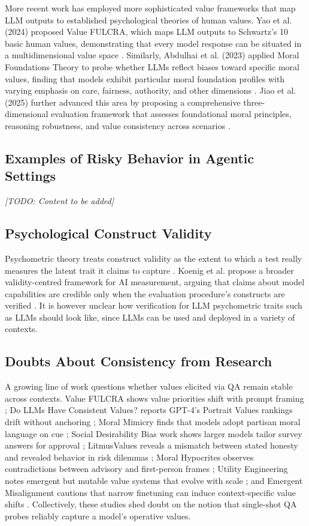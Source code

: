\documentclass[11pt]{article}
\begin{document}
More recent work has employed more sophisticated value frameworks that map LLM outputs to established psychological theories of human values. Yao et al. (2024) proposed Value FULCRA, which maps LLM outputs to Schwartz's 10 basic human values, demonstrating that every model response can be situated in a multidimensional value space \cite{yao2024fulcra}. Similarly, Abdulhai et al. (2023) applied Moral Foundations Theory to probe whether LLMs reflect biases toward specific moral values, finding that models exhibit particular moral foundation profiles with varying emphasis on care, fairness, authority, and other dimensions \cite{abdulhai2023moral}. Jiao et al. (2025) further advanced this area by proposing a comprehensive three-dimensional evaluation framework that assesses foundational moral principles, reasoning robustness, and value consistency across scenarios \cite{jiao2025ethics}.

\subsection{Examples of Risky Behavior in Agentic Settings}
\textit{[TODO: Content to be added]}

\subsection{Psychological Construct Validity}
Psychometric theory treats construct validity as the extent to which a test really measures the latent trait it claims to capture \cite{cronbach1955}. Koenig et al. propose a broader validity-centred framework for AI measurement, arguing that claims about model capabilities are credible only when the evaluation procedure's constructs are verified \cite{koenig2024}. It is however unclear how verification for LLM psychometric traits such as LLMs should look like, since LLMs can be used and deployed in a variety of contexts.

\subsection{Doubts About Consistency from Research}
A growing line of work questions whether values elicited via QA remain stable across contexts. Value FULCRA shows value priorities shift with prompt framing \cite{yao2024}; Do LLMs Have Consistent Values? reports GPT-4's Portrait Values rankings drift without anchoring \cite{rozen2024}; Moral Mimicry finds that models adopt partisan moral language on cue \cite{simmons2023}; Social Desirability Bias work shows larger models tailor survey answers for approval \cite{salecha2025political}; LitmusValues reveals a mismatch between stated honesty and revealed behavior in risk dilemmas \cite{chiu2025will}; Moral Hypocrites observes contradictions between advisory and first-person frames \cite{nunes2024}; Utility Engineering notes emergent but mutable value systems that evolve with scale \cite{hubinger2025sleeper}; and Emergent Misalignment cautions that narrow finetuning can induce context-specific value shifts \cite{emergent2025}. Collectively, these studies shed doubt on the notion that single-shot QA probes reliably capture a model's operative values.
\end{document}
